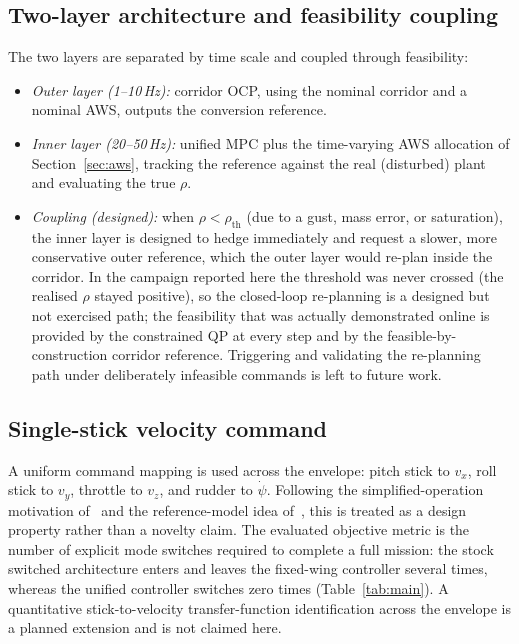 \documentclass[preprint,3p,11pt]{elsarticle}
\begin{document}
\subsection{Two-layer architecture and feasibility coupling}\label{sec:twolayer}
The two layers are separated by time scale and coupled through feasibility:
\begin{itemize}[leftmargin=1.6em,itemsep=2pt]
  \item \emph{Outer layer (1--10\,Hz):} corridor OCP, using the nominal
  corridor and a nominal AWS, outputs the conversion reference.
  \item \emph{Inner layer (20--50\,Hz):} unified MPC plus the time-varying
  AWS allocation of Section~\ref{sec:aws}, tracking the reference against the
  real (disturbed) plant and evaluating the true $\rho$.
  \item \emph{Coupling (designed):} when $\rho<\rho_{\mathrm{th}}$ (due to a
  gust, mass error, or saturation), the inner layer is designed to hedge
  immediately and request a slower, more conservative outer reference, which
  the outer layer would re-plan inside the corridor. In the campaign reported
  here the threshold was never crossed (the realised $\rho$ stayed positive),
  so the closed-loop re-planning is a designed but not exercised path; the
  feasibility that was actually demonstrated online is provided by the
  constrained QP at every step and by the feasible-by-construction corridor
  reference. Triggering and validating the re-planning path under deliberately
  infeasible commands is left to future work.
\end{itemize}

\subsection{Single-stick velocity command}\label{sec:stick}
A uniform command mapping is used across the envelope: pitch stick to
$v_x$, roll stick to $v_y$, throttle to $v_z$, and rudder to $\dot\psi$.
Following the simplified-operation motivation of~\cite{milz2026taming} and the
reference-model idea of~\cite{bhardwaj2018integrated}, this is treated as a
design property rather than a novelty claim. The evaluated objective metric is
the number of explicit mode switches required to complete a full mission: the
stock switched architecture enters and leaves the fixed-wing controller
several times, whereas the unified controller switches zero times
(Table~\ref{tab:main}). A quantitative stick-to-velocity transfer-function
identification across the envelope is a planned extension and is not claimed
here.
\end{document}
